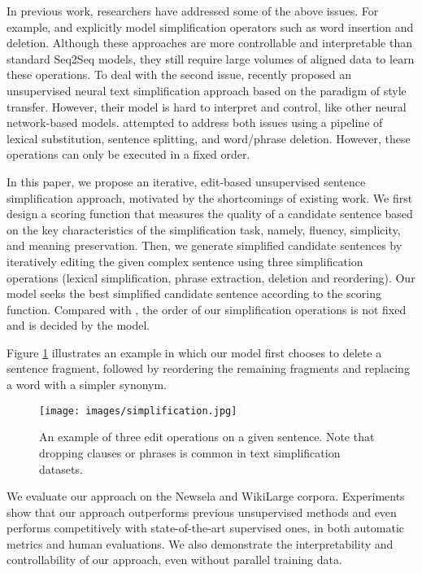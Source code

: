 \documentclass[11pt,a4paper]{article}
\begin{document}
In previous work, researchers have addressed some of the above issues. For example,  and  explicitly model simplification operators such as word insertion and deletion. Although these approaches are more controllable and interpretable than standard Seq2Seq models, they still require large volumes of aligned data to learn these operations.
To deal with the second issue,  recently proposed an unsupervised neural text simplification approach based on the paradigm of style transfer. 
However, their model is hard to interpret and control, like other neural network-based models.  attempted to address both issues using a pipeline of lexical substitution, sentence splitting, and word/phrase deletion. However, these operations can only be executed in a fixed order. 

In this paper, we propose an iterative, edit-based unsupervised sentence simplification approach, motivated by the shortcomings of existing work.
We first design a {scoring function} that measures the quality of a candidate sentence based on the key characteristics of the simplification task, namely, fluency, simplicity, and meaning preservation. 
Then, we generate simplified candidate sentences by iteratively editing the given complex sentence using three simplification operations (lexical simplification, phrase extraction, deletion and reordering). Our model seeks the best simplified candidate sentence according to the scoring function. Compared with , the order of our simplification operations is not fixed and is decided by the model.


Figure \ref{fig:example_sentence} illustrates an example in which our model first chooses to delete a sentence fragment, followed by reordering the remaining fragments and replacing a word with a simpler synonym.

\begin{figure}
  \texttt{[image: images/simplification.jpg]}\vspace{-.3cm}
  \caption{An example of three edit operations on a given sentence. Note that dropping clauses or phrases is common in text simplification datasets.}\vspace{-.2cm}
  \label{fig:example_sentence}
\end{figure}





We evaluate our approach on the Newsela \cite{xu2015problems} and WikiLarge \cite{zhang2017sentence} corpora. 
Experiments show that our approach outperforms previous unsupervised methods and even performs competitively with state-of-the-art supervised ones, in both automatic metrics and human evaluations. We also demonstrate the interpretability and controllability of our approach, even without parallel training data.
\end{document}

